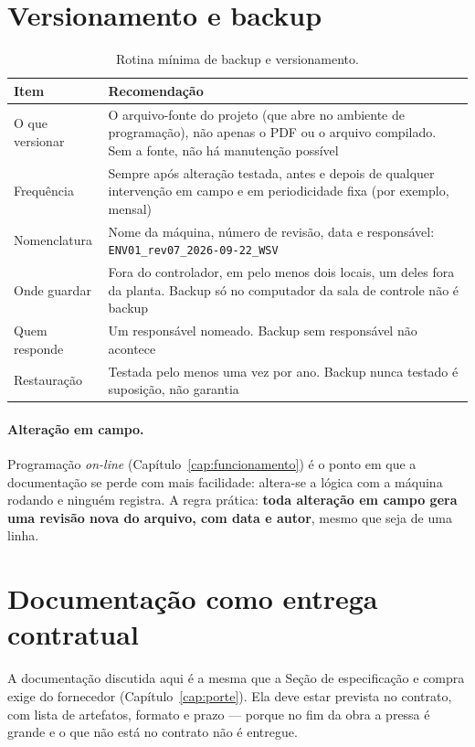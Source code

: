 \section{Versionamento e backup}

\begin{table}[H]
  \centering
  \caption{Rotina mínima de backup e versionamento.}
  \label{tab:backup}
  \begin{tabular}{p{4.4cm} p{10.2cm}}
    \toprule
    Item & Recomendação \\
    \midrule
    O que versionar
      & O arquivo-fonte do projeto (que abre no ambiente de programação), não apenas o PDF ou o
        arquivo compilado. Sem a fonte, não há manutenção possível \\
    Frequência
      & Sempre após alteração testada, antes e depois de qualquer intervenção em campo e em
        periodicidade fixa (por exemplo, mensal) \\
    Nomenclatura
      & Nome da máquina, número de revisão, data e responsável: \texttt{ENV01\_rev07\_2026-09-22\_WSV} \\
    Onde guardar
      & Fora do controlador, em pelo menos dois locais, um deles fora da planta. Backup só no
        computador da sala de controle não é backup \\
    Quem responde
      & Um responsável nomeado. Backup sem responsável não acontece \\
    Restauração
      & Testada pelo menos uma vez por ano. Backup nunca testado é suposição, não garantia \\
    \bottomrule
  \end{tabular}
\end{table}

\paragraph{Alteração em campo.} Programação \emph{on-line} (Capítulo~\ref{cap:funcionamento}) é o
ponto em que a documentação se perde com mais facilidade: altera-se a lógica com a máquina rodando e
ninguém registra. A regra prática: \textbf{toda alteração em campo gera uma revisão nova do arquivo,
com data e autor}, mesmo que seja de uma linha.

\section{Documentação como entrega contratual}

A documentação discutida aqui é a mesma que a Seção de especificação e compra exige do fornecedor
(Capítulo~\ref{cap:porte}). Ela deve estar prevista no contrato, com lista de artefatos, formato e
prazo --- porque no fim da obra a pressa é grande e o que não está no contrato não é entregue.

